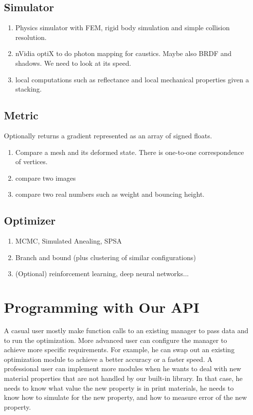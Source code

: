 \documentclass[annual]{acmsiggraph}
\begin{document}
\subsection{Simulator}
\begin{enumerate}
\item Physics simulator with FEM, rigid body simulation
and simple collision resolution.
\item nVidia optiX to do photon mapping for caustics. Maybe also BRDF and shadows.
We need to look at its speed.
\item local computations such as reflectance and local mechanical properties given a stacking.
\end{enumerate}

\subsection{Metric}
Optionally returns a gradient represented as an array of signed floats.
\begin{enumerate}
\item Compare a mesh and its deformed state. There is one-to-one correspondence of 
vertices.
\item compare two images
\item compare two real numbers such as weight and bouncing height.
\end{enumerate}

\subsection{Optimizer}
\begin{enumerate}
\item MCMC, Simulated Anealing, SPSA
\item Branch and bound (plus clustering of similar configurations)
\item (Optional) reinforcement learning, deep neural networks...
\end{enumerate}

\section{Programming with Our API}
A casual user mostly make function calls to an existing 
manager to pass data and to run the optimization.
More advanced user can configure the manager to achieve more specific requirements.
For example, he can swap out an existing optimization module to achieve a better accuracy or 
a faster speed.
A professional user can implement more modules when he wants to deal with new
material properties that are not handled by our built-in library. In that case,
he needs to know what value the new property is in print materials, he needs to know
how to simulate for the new property, and how to measure error of the new property.
\end{document}
